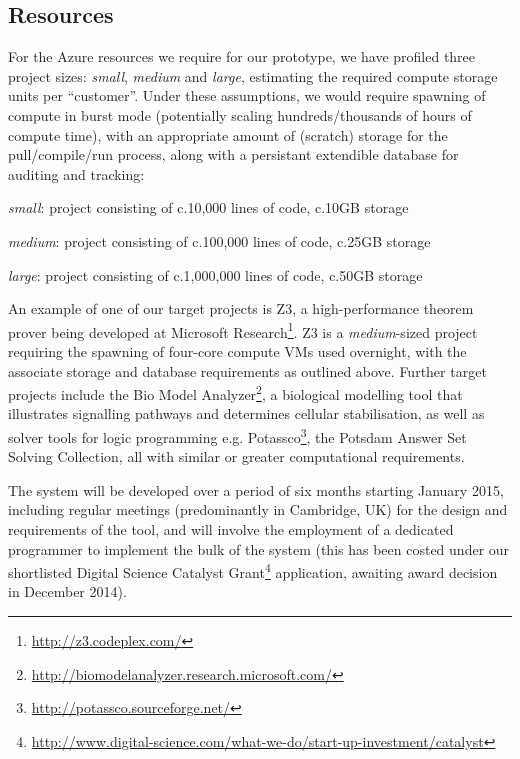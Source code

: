 \documentclass[a4paper,10pt]{article}
\begin{document}
\subsection*{Resources}

For the Azure resources we require for our prototype, we have profiled
three project sizes: {\emph{small}}, {\emph{medium}} and
{\emph{large}}, estimating the required compute storage units per
``customer''. Under these assumptions, we would require spawning of
compute in burst mode (potentially scaling hundreds/thousands of hours
of compute time), with an appropriate amount of (scratch) storage for
the pull/compile/run process, along with a persistant extendible
database for auditing and tracking:\\

\begin{compactitem}
\item {\emph{small}}: project consisting of c.10,000 lines of code,
  c.10GB storage
\item {\emph{medium}}: project consisting of c.100,000 lines of code,
  c.25GB storage
\item {\emph{large}}: project consisting of c.1,000,000 lines of code,
 c.50GB storage\\
\end{compactitem}

An example of one of our target projects is Z3, a high-performance
theorem prover being developed at Microsoft
Research\footnote{\url{http://z3.codeplex.com/}}. Z3 is a
{\emph{medium}}-sized project requiring the spawning of four-core
compute VMs used overnight, with the associate storage and database
requirements as outlined above. Further target projects include the
Bio Model Analyzer\footnote{\url{http://biomodelanalyzer.research.microsoft.com/}},
a biological modelling tool that illustrates signalling pathways and
determines cellular stabilisation, as well as solver tools for logic
programming
e.g. Potassco\footnote{\url{http://potassco.sourceforge.net/}}, the
Potsdam Answer Set Solving Collection, all with similar or greater
computational requirements.

The system will be developed over a period of six months starting January
2015, including regular meetings (predominantly in Cambridge, UK) for
the design and requirements of the tool, and will involve the
employment of a dedicated programmer to implement the bulk of the
system (this has been costed under our shortlisted Digital
Science Catalyst
Grant\footnote{\url{http://www.digital-science.com/what-we-do/start-up-investment/catalyst}}
application, awaiting award decision in December 2014).
\end{document}
